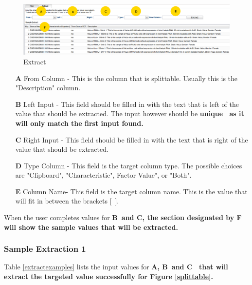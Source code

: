 \documentclass[a4paper]{article}
\begin{document}
\begin{figure}[h]
\caption{Extract}
\centering
\label{extracttool}
\includegraphics[width=17cm]{images/Extract}
\end{figure}

\begin{enumerate}
\item[\bf{A}] From Column - This is the column that is splittable. Usually this is the "Description" column.
\item[\bf{B}] Left Input -  This field should be filled in with the text that is left of the value that should be extracted. The input however should be \bf{unique}\rm~ as it will only match the first input found.
\item[\bf{C}] Right Input - This field should be filled in with the text that is right of the value that should be extracted.
\item[\bf{D}] Type Column - This field is the target column type. The possible choices are "Clipboard", "Characteristic", Factor Value", or "Both".
\item[\bf{E}] Column Name- This field is the target column name. This is the value that will fit in between the brackets [~].
\end{enumerate}

When the user completes values for \bf{B}\rm ~and \bf{C}\rm , the section designated by \bf{F}\rm~ will show the sample values that will be extracted. 


\subsubsection{Sample Extraction 1}

Table \ref{extractexamples} lists the input values for \bf{A}\rm, \bf{B}\rm ~and \bf{C}\rm~ that will extract the targeted value successfully for Figure \ref{splittable}.
\end{document}
